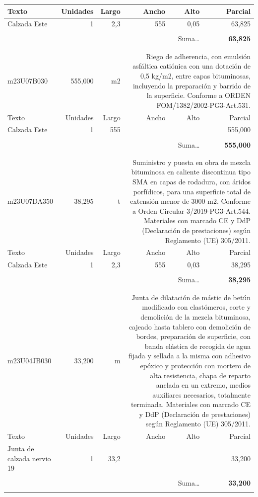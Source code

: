 \documentclass{book}%
\begin{document}
\begin{longtable}{lrrrrr}
Texto&Unidades&Largo&Ancho&Alto&Parcial\\%
\hline%
\multicolumn{1}{p{3.5cm}}{Calzada Este}&1&2,3&555&0,05&    63,825\\%
&&&&&\\%
\multicolumn{5}{r}{Suma\ldots}&\textbf{    63,825}\\%
\hline%
&&&&&\\%
&&&&&\\%
m23U07B030&   555,000& m2&\multicolumn{3}{p{6cm}}{\scriptsize Riego de adherencia, con emulsión asfáltica catiónica con una dotación de 0,5 kg/m2, entre capas bituminosas, incluyendo la preparación y barrido de la superficie. Conforme a ORDEN FOM/1382/2002-PG3-Art.531.\normalsize}\\%
Texto&Unidades&Largo&Ancho&Alto&Parcial\\%
\hline%
\multicolumn{1}{p{3.5cm}}{Calzada Este}&1&555&&&   555,000\\%
&&&&&\\%
\multicolumn{5}{r}{Suma\ldots}&\textbf{   555,000}\\%
\hline%
&&&&&\\%
&&&&&\\%
m23U07DA350&    38,295& t&\multicolumn{3}{p{6cm}}{\scriptsize Suministro y puesta en obra de mezcla bituminosa en caliente discontinua tipo SMA en capas de rodadura, con áridos porfídicos, para una superficie total de extensión menor de 3000 m2. Conforme a Orden Circular 3/2019-PG3-Art.544. Materiales con marcado CE y DdP (Declaración de prestaciones) según Reglamento (UE) 305/2011.\normalsize}\\%
Texto&Unidades&Largo&Ancho&Alto&Parcial\\%
\hline%
\multicolumn{1}{p{3.5cm}}{Calzada Este}&1&2,3&555&0,03&    38,295\\%
&&&&&\\%
\multicolumn{5}{r}{Suma\ldots}&\textbf{    38,295}\\%
\hline%
&&&&&\\%
&&&&&\\%
m23U04JB030&    33,200& m&\multicolumn{3}{p{6cm}}{\scriptsize Junta de dilatación de mástic de betún modificado con elastómeros, corte y demolición de la mezcla bituminosa, cajeado hasta tablero con demolición de bordes, preparación de superficie, con banda elástica de recogida de agua fijada y sellada a la misma con adhesivo epóxico y protección con mortero de alta resistencia, chapa de reparto anclada en un extremo, medios auxiliares necesarios, totalmente terminada. Materiales con marcado CE y DdP (Declaración de prestaciones) según Reglamento (UE) 305/2011.\normalsize}\\%
Texto&Unidades&Largo&Ancho&Alto&Parcial\\%
\hline%
\multicolumn{1}{p{3.5cm}}{Junta de calzada nervio 19 }&1&33,2&&&    33,200\\%
&&&&&\\%
\multicolumn{5}{r}{Suma\ldots}&\textbf{    33,200}\\%
\hline%
&&&&&\\%
\end{longtable}%
\newpage
\end{document}
